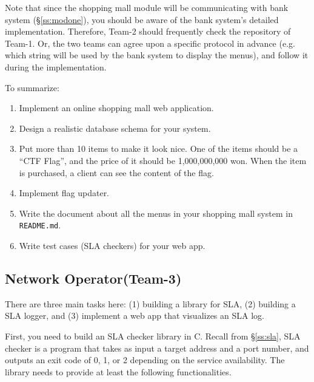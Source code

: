 \documentclass[a4paper, 11pt]{article}
\newcommand*{\Modthree}{Network Operator\xspace}%
\theoremstyle{definition}
\begin{document}
{Note that since the shopping mall module will be communicating with
bank system (\S\ref{ss:modone}), you should be aware of the bank
system's detailed implementation. Therefore, Team-2 should frequently
check the repository of Team-1. Or, the two teams can agree upon a
specific protocol in advance (e.g. which string will be used by the
bank system to display the menus), and follow it during the
implementation.

To summarize:
\begin{enumerate}

  \item Implement an online shopping mall web application.

  \item Design a realistic database schema for your system.

  \item Put more than 10 items to make it look nice. One of the items
    should be a ``CTF Flag'', and the price of it should be
    1,000,000,000 won. When the item is purchased, a client can see
    the content of the flag.

  \item Implement flag updater.

  \item Write the document about all the menus in your shopping mall
    system in \texttt{README.md}.

  \item Write test cases (SLA checkers) for your web app.
\end{enumerate}

\subsection{\Modthree (Team-3)} \label{ss:modthree}

There are three main tasks here: (1) building a library for SLA, (2)
building a SLA logger, and (3) implement a web app that visualizes an
SLA log.

First, you need to build an SLA checker library in C. Recall from
\S\ref{ss:sla}, SLA checker is a program that takes as input a target
address and a port number, and outputs an exit code of 0, 1, or 2
depending on the service availability. The library needs to provide at
least the following functionalities.

}
\end{document}

